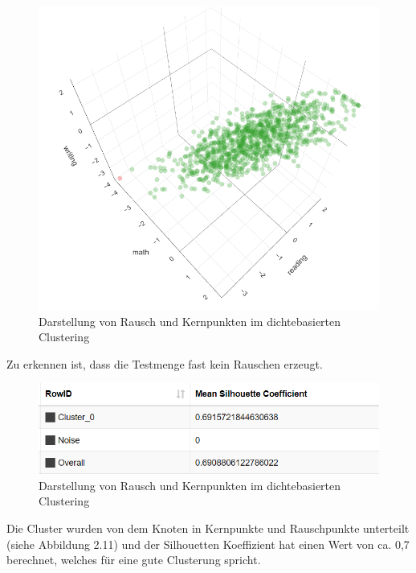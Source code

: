 \documentclass[12pt,					%
							 oneside,			%
							 a4paper,			%
							 halfparskip,		%
							 liststotoc,			%
							 bibtotoc,			%
							 fleqn,				%
							 pointlessnumbers]	%
							 {scrreprt}
\begin{document}
		\begin{figure}[!h]
			\begin{center}
				\includegraphics[scale=0.5]{pictures/plotly_dense.png}
				\caption{Darstellung von Rausch und Kernpunkten im dichtebasierten Clustering}
			\end{center}
		\end{figure}
		
		Zu erkennen ist, dass die Testmenge fast kein Rauschen erzeugt. 
		
		\begin{figure}[!h]
			\begin{center}
				\includegraphics[scale=0.7]{pictures/sil_dens.png}
				\caption{Darstellung von Rausch und Kernpunkten im dichtebasierten Clustering}
			\end{center}
		\end{figure}
		
		Die Cluster wurden von dem Knoten in Kernpunkte und Rauschpunkte unterteilt (siehe Abbildung 2.11) und der Silhouetten Koeffizient hat einen Wert von ca. 0,7 berechnet, welches für eine gute Clusterung spricht. 
		\newpage
\end{document}
